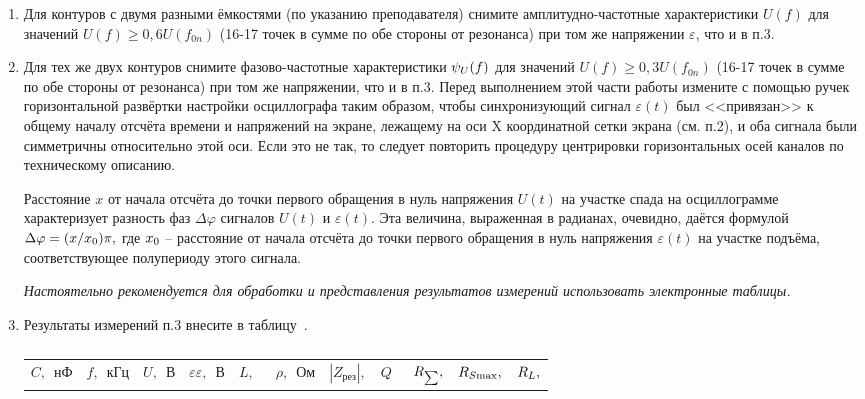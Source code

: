 \begin{lab:task}
\begin{enumerate}
    \item Для контуров с двумя разными ёмкостями (по указанию преподавателя) снимите амплитудно-частотные характеристики $U(f)$ для значений $U(f)\ge0,6U(f_{0n})$ (16-17 точек в сумме по обе стороны от резонанса) при том же напряжении $\varepsilon$, что и в п.3.

    \item Для тех же двух контуров снимите фазово-частотные характеристики $\psi_{\sc{U}}(f)$ для значений $U(f)\ge0,3U(f_{0n})$ (16-17 точек в сумме по обе стороны от резонанса) при том же напряжении, что и в п.3. Перед выполнением этой части работы измените с помощью ручек горизонтальной развёртки настройки осциллографа таким образом, чтобы синхронизующий сигнал $\varepsilon(t)$ был <<привязан>> к общему началу отсчёта времени и напряжений на экране, лежащему на оси X координатной сетки экрана (см. п.2), и оба сигнала были симметричны относительно этой оси. Если это не так, то следует повторить процедуру центрировки горизонтальных осей каналов по техническому описанию.

    Расстояние $x$ от начала отсчёта до точки первого обращения в нуль напряжения $U(t)$ на участке спада на осциллограмме характеризует разность фаз $\Delta\varphi$ сигналов $U(t)$ и $\varepsilon(t).$ Эта величина, выраженная в радианах, очевидно, даётся формулой $\Delta\varphi=(x/x_{\sc{0}})\pi,$ где $x_{\sc{0}}$ – расстояние от начала отсчёта до точки первого обращения в нуль напряжения $\varepsilon(t)$ на участке подъёма, соответствующее полупериоду этого сигнала.

	\emph{Настоятельно рекомендуется для обработки и представления результатов измерений использовать электронные таблицы.}

	\item Результаты измерений п.3 внесите в таблицу~.
	\begin{center}
	    \begin{table}[h!]
	        \caption{}
	        \begin{center}
	            \begin{tabular}{|c|c|c|c|c|c|c|c|c|c|c|}
	                \hline
	                $C,$~нФ& $f,$~кГц& $U,$~В & $\varepsilon\varepsilon,$~В& $L,$~& $\rho,$~Ом& $|Z_{\text{рез}}|,$& $Q$~& $R_{\sc{\sum}},$& $R_{\sc{S}\text{max}},$& $R_{\sc{L}},$\\
	

\end{tabular}
\end{center}
\end{table}
\end{center}
\end{enumerate}
\end{lab:task}
